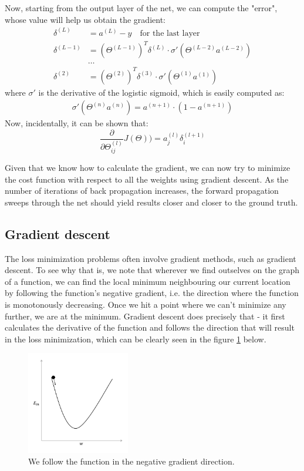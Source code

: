 \documentclass[a4paper, 12pt]{article}
\numberwithin{equation}{section}
\begin{document}
	Now, starting from the output layer of the net, we can compute the "error", whose value will help us obtain the gradient:
	\begin{align}
	\delta^{(L)} &= a^{(L)} - y \quad \textrm{for the last layer} \\
	\delta^{(L-1)} &= (\Theta ^ {(L-1)})^T \delta^{(L)} \cdot \sigma'(\Theta^{(L-2)} a^{(L-2)}) \\
	&\ldots \\
	\delta^{(2)} &= (\Theta ^ {(2)})^T \delta^{(3)} \cdot \sigma'(\Theta^{(1)} a^{(1)})
	\end{align}
	where $\sigma'$ is the derivative of the logistic sigmoid, which is easily computed as:
	\begin{align}
	\sigma'(\Theta^{(n)} a^{(n)}) = a^{(n+1)} \cdot (1-a^{(n+1)})
	\end{align}
	Now, incidentally, it can be shown that:
	\begin{equation}
	\frac{\partial}{\partial \Theta_{ij}^{(l)}} J(\Theta)) = a_j^{(l)} \delta_i^{(l+1)}
	\end{equation}
	
	Given that we know how to calculate the gradient, we can now try to minimize the cost function with respect to all the weights using gradient descent. As the number of iterations of back propagation increases, the forward propagation sweeps through the net should yield results closer and closer to the ground truth.
	
	\subsection{Gradient descent}
	The loss minimization problems often involve gradient methods, such as gradient descent. To see why that is, we note that wherever we find outselves on the graph of a function, we can find the local minimum neighbouring our current location by following the function's negative gradient, i.e. the direction where the function is monotonously decreasing. Once we hit a point where we can't minimize any further, we are at the minimum. Gradient descent does precisely that - it first calculates the derivative of the function and follows the direction that will result in the loss minimization, which can be clearly seen in the figure \ref{fig:graddesc} below.
	
	\begin{figure}[!h]
		\centering
		\includegraphics[page=1,width=0.40\textwidth]{graddesc.pdf}
		\caption{\label{fig:graddesc}{We follow the function in the negative gradient direction.}}
	\end{figure}
	
\end{document}
